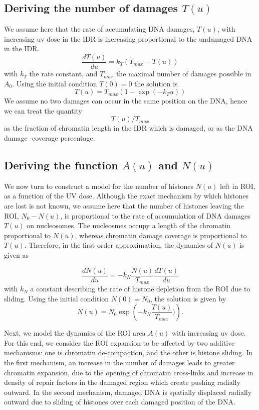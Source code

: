 \documentclass[12pt]{article}
\begin{document}
\subsection{Deriving the number of damages $T(u)$}
We assume here that the rate of accumulating DNA damages, $T(u)$, with increasing uv dose in the IDR is increasing proportional to the undamaged DNA in the IDR.
\begin{equation}
\frac{dT(u)}{du}=k_T\left(T_{max}-T(u)\right)
\end{equation}
with $k_T$ the rate constant, and $T_{max}$ the maximal number of damages possible in $A_0$. 
Using the initial condition $T(0) = 0$ the solution is
\begin{equation}
T(u) = T_{max}\left(1-\exp(-k_T u)\right) 
\end{equation}
We assume no two damages can occur in the same position on the DNA, hence we can treat the quantity 
\begin{equation*}
T(u)/T_{max}
\end{equation*}
as the fraction of chromatin length in the IDR which is damaged, or as the DNA damage -coverage percentage. 

\subsection{Deriving the function $A(u)$ and $N(u)$}
We now turn to construct a model for the number of histones $N(u)$ left in ROI, as a function of the UV dose. Although the exact mechanism by which histones are lost is not known, we assume here that the number of histones leaving the ROI, $N_0-N(u)$, is proportional to the rate of accumulation of DNA damages $T(u)$ on nucleosomes. The nucleosmes occupy a length of the chromatin proportional to $N(u)$, whereas chromatin damage coverage is proportional to $T(u)$. Therefore, in the first-order approximation, the dynamics of $N(u)$ is given as 

\begin{equation*}
\frac{dN(u)}{du} = -k_N\frac{N(u)}{T_{max}}\frac{dT(u)}{du}
\end{equation*}
with $k_N$ a constant describing the rate of histone depletion from the ROI due to sliding. Using the initial condition $N(0) = N_0$, the solution is given by
\begin{equation}\label{eq:NumHistones}
N(u) = N_0\exp\left(-k_N\frac{T(u)}{T_{max}})\right).
\end{equation}

Next, we model the dynamics of the ROI area $A(u)$ with increasing uv dose.  For this end, we consider the ROI expansion to be affected by two additive mechanisms: one is chromatin de-compaction, and the other is histone sliding. In the first mechanism, an increase in the number of damages leads to greater chromatin expansion, due to the opening of chromatin cross-links and increase in density of repair factors in the damaged region which create pushing radially outward.  In the second mechanism, damaged DNA is spatially displaced radially outward due to sliding of histones over each damaged position of the DNA. 
\end{document}
